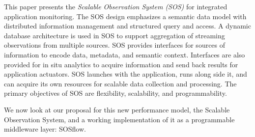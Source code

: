 This paper presents the \textit{Scalable Observation System (SOS)} for
integrated application monitoring.
%
The SOS design emphasizes a semantic data model with distributed
information management and structured query and access.
%
A dynamic database architecture is used in SOS to support aggregation
of streaming observations from multiple sources.
%
SOS provides interfaces for sources of information to encode data,
metadata, and semantic context.
%
Interfaces are also provided for in situ analytics to acquire
information and send back results for application actuators.
%
SOS launches with the application, runs along side it, and can acquire
its own resources for scalable data collection and processing.
%
The primary objectives of SOS are flexibility, scalability, and
programmability.


We now look at our proposal for this new performance model, the
Scalable Observation System, and a working implementation of it
as a programmable middleware layer: SOSflow.


